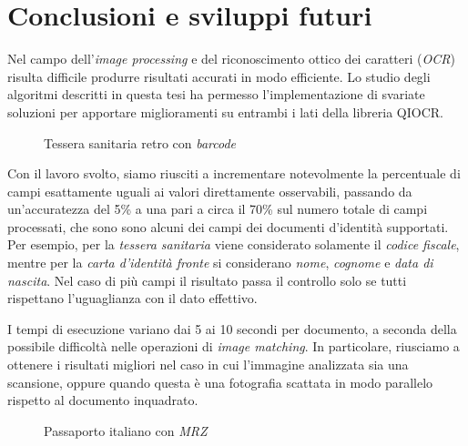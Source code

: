 \chapter*{Conclusioni e sviluppi futuri}

Nel campo dell'\textit{image processing} e del riconoscimento ottico dei caratteri (\textit{OCR}) risulta difficile produrre risultati accurati in modo efficiente. Lo studio degli algoritmi descritti in questa tesi ha permesso l'implementazione di svariate soluzioni per apportare miglioramenti su entrambi i lati della libreria QIOCR.\par
\begin{figure}
	\centering
	\caption{Tessera sanitaria retro con \textit{barcode}} \label{fig:ts-r-example}
\end{figure}
Con il lavoro svolto, siamo riusciti a incrementare notevolmente la percentuale di campi esattamente uguali ai valori direttamente osservabili, passando da un'accuratezza del 5\% a una pari a circa il 70\% sul numero totale di campi processati, che sono sono alcuni dei campi dei documenti d'identit\`a supportati. 
Per esempio, per la \textit{tessera sanitaria} viene considerato solamente il \textit{codice fiscale}, mentre per la \textit{carta d'identit\`a fronte} si considerano \textit{nome}, \textit{cognome} e \textit{data di nascita}. Nel caso di pi\`u campi il risultato passa il controllo solo se tutti rispettano l'uguaglianza con il dato effettivo.\par 
I tempi di esecuzione variano dai 5 ai 10 secondi per documento, a seconda della possibile difficolt\`a nelle operazioni di \textit{image matching}. In particolare, riusciamo a ottenere i risultati migliori nel caso in cui l'immagine analizzata sia una scansione, oppure quando questa \`e una fotografia scattata in modo parallelo rispetto al documento inquadrato.\par
\begin{figure}
	\centering
	\caption{Passaporto italiano con \textit{MRZ}\protect\footnotemark} \label{fig:passport}
\end{figure}
